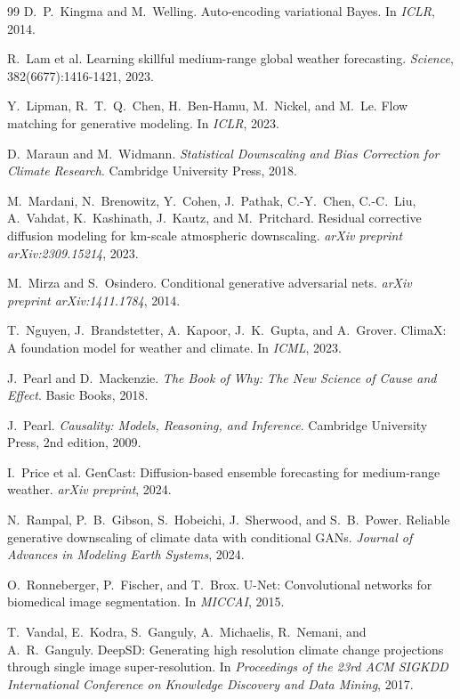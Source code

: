 \begin{thebibliography}{99}
 D.~P.~Kingma and M.~Welling. Auto-encoding variational Bayes. In \emph{ICLR}, 2014.

 R.~Lam et al. Learning skillful medium-range global weather forecasting. \emph{Science}, 382(6677):1416-1421, 2023.

 Y.~Lipman, R.~T.~Q.~Chen, H.~Ben-Hamu, M.~Nickel, and M.~Le. Flow matching for generative modeling. In \emph{ICLR}, 2023.

 D.~Maraun and M.~Widmann. \emph{Statistical Downscaling and Bias Correction for Climate Research}. Cambridge University Press, 2018.

 M.~Mardani, N.~Brenowitz, Y.~Cohen, J.~Pathak, C.-Y.~Chen, C.-C.~Liu, A.~Vahdat, K.~Kashinath, J.~Kautz, and M.~Pritchard. Residual corrective diffusion modeling for km-scale atmospheric downscaling. \emph{arXiv preprint arXiv:2309.15214}, 2023.

 M.~Mirza and S.~Osindero. Conditional generative adversarial nets. \emph{arXiv preprint arXiv:1411.1784}, 2014.

 T.~Nguyen, J.~Brandstetter, A.~Kapoor, J.~K.~Gupta, and A.~Grover. ClimaX: A foundation model for weather and climate. In \emph{ICML}, 2023.

 J.~Pearl and D.~Mackenzie. \emph{The Book of Why: The New Science of Cause and Effect}. Basic Books, 2018.

 J.~Pearl. \emph{Causality: Models, Reasoning, and Inference}. Cambridge University Press, 2nd edition, 2009.

 I.~Price et al. GenCast: Diffusion-based ensemble forecasting for medium-range weather. \emph{arXiv preprint}, 2024.

 N.~Rampal, P.~B.~Gibson, S.~Hobeichi, J.~Sherwood, and S.~B.~Power. Reliable generative downscaling of climate data with conditional GANs. \emph{Journal of Advances in Modeling Earth Systems}, 2024.

 O.~Ronneberger, P.~Fischer, and T.~Brox. U-Net: Convolutional networks for biomedical image segmentation. In \emph{MICCAI}, 2015.

 T.~Vandal, E.~Kodra, S.~Ganguly, A.~Michaelis, R.~Nemani, and A.~R.~Ganguly. DeepSD: Generating high resolution climate change projections through single image super-resolution. In \emph{Proceedings of the 23rd ACM SIGKDD International Conference on Knowledge Discovery and Data Mining}, 2017.


\end{thebibliography}
